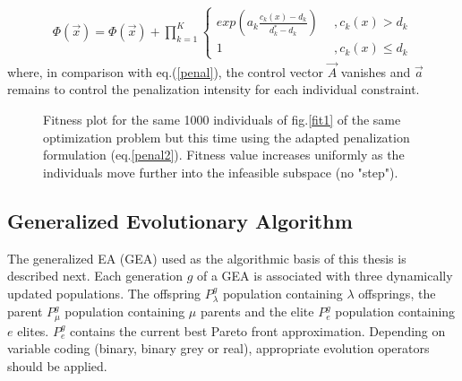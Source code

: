 \begin{eqnarray}
	\Phi(\vec{x})=\Phi(\vec{x})+ \prod _{k=1}^K{\left\{ 				\begin{array}{ll}
    exp(a_k\frac{c_k(x)-d_k}{d_k^* -d_k}) & ~~,c_k(x)>d_k\\
    1 & ~~,c_k(x)\leq d_k\end{array} \right. }
    \label{penal2}
\end{eqnarray}  
where, in comparison with eq.(\ref{penal}), the control vector $\vec{A}$ vanishes and $\vec{a}$ remains to control the penalization intensity for each individual constraint.

\begin{figure}[h!]
\begin{minipage}[b]{1.0\linewidth}
 \centering
\end{minipage}
\caption{Fitness plot for the same 1000 individuals of fig.\ref{fit1} of the same optimization problem but this time using the adapted penalization formulation (eq.\ref{penal2}). Fitness value increases uniformly as the individuals move further into the infeasible subspace (no "step").}
\label{fit2}
\end{figure}
 
\subsection{Generalized Evolutionary Algorithm}

The generalized EA (GEA) used as the algorithmic basis of this thesis is described next.
Each generation $g$ of a GEA is associated with three dynamically updated populations. The offspring $P_{\lambda}^g$ population containing $\lambda$ offsprings, the parent $P_{\mu}^g$ population containing $\mu$ parents and the elite $P_{e}^g$ population containing $e$ elites. $P_{e}^g$ contains the current best Pareto front approximation. Depending on variable coding (binary, binary grey or real), appropriate evolution operators should be applied. 

